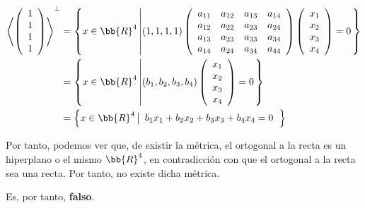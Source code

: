 \begin{ejercicio}
\begin{enumerate}
        \begin{equation*}\begin{split}
            \left<\left( \begin{array}{c}
           1 \\ 1 \\ 1 \\ 1
        \end{array}\right)\right>^\perp & = \left\{x\in \bb{R}^4 \left|
            (1,1,1,1)\left( \begin{array}{cccc}
                a_{11} & a_{12} & a_{13} & a_{14} \\
                a_{12} & a_{22} & a_{23} & a_{24} \\
                a_{13} & a_{23} & a_{33} & a_{34} \\
                a_{14} & a_{24} & a_{34} & a_{44}
            \end{array}\right)
            \left( \begin{array}{c}
                x_1 \\ x_2 \\ x_3 \\ x_4
            \end{array}\right)
            = 0
            \right.\right\}\\
            & = \left\{x\in \bb{R}^4 \left|
            (b_1, b_2, b_3, b_4)
            \left( \begin{array}{c}
                x_1 \\ x_2 \\ x_3 \\ x_4
            \end{array}\right)
            = 0
            \right.\right\} \\
            &= \left\{x\in \bb{R}^4 \left|
            \begin{array}{c}
                b_1x_1 + b_2x_2 + b_3x_3 + b_4x_4= 0
            \end{array}
            \right.\right\}
        \end{split}\end{equation*}

        Por tanto, podemos ver que, de existir la métrica, el ortogonal a la recta es un hiperplano o el mismo $\bb{R}^4$, en contradicción con que el ortogonal a la recta sea una recta. Por tanto, no existe dicha métrica.

        Es, por tanto, \textbf{falso}.
    \end{enumerate}
\end{ejercicio}

